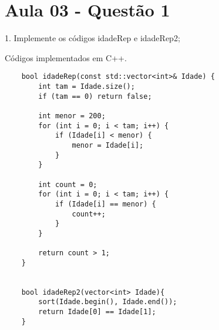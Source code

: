 \section{Aula 03 - Questão 1}

1. Implemente os códigos idadeRep e idadeRep2;

Códigos implementados em C++.


\begin{verbatim}
    bool idadeRep(const std::vector<int>& Idade) {
        int tam = Idade.size();
        if (tam == 0) return false; 
    
        int menor = 200;  
        for (int i = 0; i < tam; i++) {
            if (Idade[i] < menor) {
                menor = Idade[i];
            }
        }
    
        int count = 0;
        for (int i = 0; i < tam; i++) {
            if (Idade[i] == menor) {
                count++;  
            }
        }
    
        return count > 1; 
    }
    
    
    bool idadeRep2(vector<int> Idade){
        sort(Idade.begin(), Idade.end());
        return Idade[0] == Idade[1];
    }

\end{verbatim}